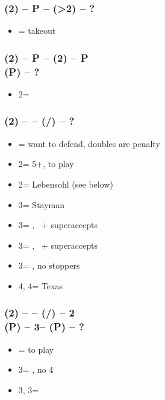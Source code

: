 \subsubsection*{(2\diams) -- P -- (>2\spades) -- ?}
\begin{itemize}
    \item \dbl = takeout \imp
\end{itemize}

\subsubsection*{(2\diams) -- P -- (2\hearts) -- P \\
                (P) -- ?}        
\begin{itemize}
    \item 2\nt = \minor
\end{itemize}

\subsubsection*{(2\diams) -- \dbl -- (\rdbl/\pass) -- ?}        
\begin{itemize}
    \item \pass = want to defend, doubles are penalty
    \item 2\major = 5+\major, to play
    \item 2\nt = Lebensohl (see below)
    \item 3\clubs = Stayman \vimp
    \item 3\diams = \trsf{\hearts}, \gf\ + superaccepts
    \item 3\hearts = \trsf{\spades}, \gf\ + superaccepts
    \item 3\spades = \trsf{\nt}, no \major stoppers
    \item 4\diams, 4\hearts = Texas
\end{itemize}

\subsubsection*{(2\diams) -- \dbl -- (\rdbl/\pass) -- 2\nt \\
                (P) -- 3\clubs -- (P) -- ?}        
\begin{itemize}
    \item \pass = to play
    \item 3\diams = \gf, no 4\major \vimp
    \item 3\hearts, 3\spades = \inv
\end{itemize}


